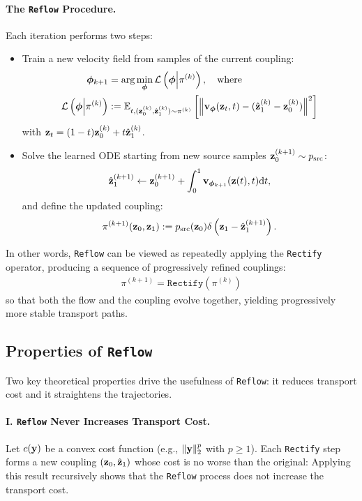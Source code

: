 \paragraph{The \texttt{Reflow} Procedure.}
Each iteration performs two steps:
\begin{itemize} 
    \item {} Train a new velocity field from samples of the current coupling: \begin{align} \bm{\phi}_{k+1} &= \arg\min_{\bm{\phi}} \mathcal{L}\left(\bm{\phi}\Big\vert \pi^{(k)}\right), \quad \text{where} \notag \\ \mathcal{L}\left(\bm{\phi}\Big\vert \pi^{(k)}\right) &:= \mathbb{E}_{t, ({\mathbf{z}}_0^{(k)}, \hat{{\mathbf{z}}}_1^{(k)})\sim \pi^{(k)}} \left[\left\|{\mathbf{v}}_{\bm{\phi}}({\mathbf{z}}_t, t) - (\hat{{\mathbf{z}}}_1^{(k)} - {\mathbf{z}}_0^{(k)})\right\|^2\right] \label{eq:reflow-loss} \end{align} with ${\mathbf{z}}_t = (1-t){\mathbf{z}}_0^{(k)} + t\hat{{\mathbf{z}}}_1^{(k)}$. 
    \item {} Solve the learned ODE starting from new source samples ${\mathbf{z}}_0^{(k+1)} \sim p_{\text{src}}$: \[ \hat{{\mathbf{z}}}_1^{(k+1)} \gets {\mathbf{z}}_0^{(k+1)} + \int_0^1 {\mathbf{v}}_{\bm{\phi}_{k+1}}({\mathbf{z}}(t), t) \mathrm{d}t, \] and define the updated coupling: \[ \pi^{(k+1)}({\mathbf{z}}_0, {\mathbf{z}}_1) := p_{\text{src}}({\mathbf{z}}_0) \delta\left({\mathbf{z}}_1 - \hat{{\mathbf{z}}}_1^{(k+1)}\right). \] \end{itemize}
In other words, \texttt{Reflow} can be viewed as repeatedly applying the \texttt{Rectify} operator, producing a sequence of progressively refined couplings:
\begin{align}\label{eq:rectify-op}
    \pi^{(k+1)} = \texttt{Rectify} \left(\pi^{(k)}\right)
\end{align}
so that both the flow and the coupling evolve together, yielding progressively more stable transport paths.



\subsection{Properties of \texttt{Reflow}}\label{subsec:reflow-properties}

Two key theoretical properties drive the usefulness of \texttt{Reflow}: it reduces transport cost and it straightens the trajectories.

\paragraph{I. \texttt{Reflow} Never Increases Transport Cost.}
Let $c({\mathbf{y}})$ be a convex cost function (e.g., $\|{\mathbf{y}}\|_2^p$ with $p \geq 1$). Each \texttt{Rectify} step forms a new coupling $({\mathbf{z}}_0, \hat{{\mathbf{z}}}_1)$ whose cost is no worse than the original:
Applying this result recursively shows that the \texttt{Reflow} process does not increase the transport cost.

